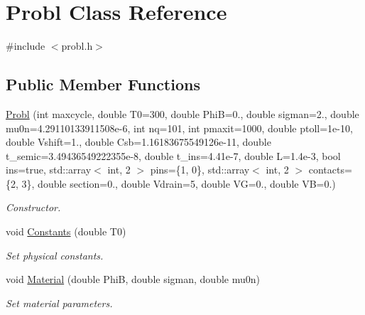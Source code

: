 \hypertarget{class_probl}{}\section{Probl Class Reference}
\label{class_probl}


{\ttfamily \#include $<$probl.\+h$>$}

\subsection*{Public Member Functions}
\begin{DoxyCompactItemize}
\item 
\mbox{\label{class_probl_a692b15a88516cb52437bd60f33a8edf0}} 
\mbox{\hyperlink{class_probl_a692b15a88516cb52437bd60f33a8edf0}{Probl}} (int maxcycle, double T0=300, double PhiB=0., double sigman=2., double mu0n=4.\+29110133911508e-\/6, int nq=101, int pmaxit=1000, double ptoll=1e-\/10, double Vshift=1., double Csb=1.\+16183675549126e-\/11, double t\+\_\+semic=3.\+49436549222355e-\/8, double t\+\_\+ins=4.\+41e-\/7, double L=1.\+4e-\/3, bool ins=true, std\+::array$<$ int, 2 $>$ pins=\{1, 0\}, std\+::array$<$ int, 2 $>$ contacts=\{2, 3\}, double section=0., double Vdrain=5, double V\+G=0., double V\+B=0.)
\begin{DoxyCompactList}\small\item\em Constructor. \end{DoxyCompactList}\item 
\mbox{\label{class_probl_ab73c319317dcb9cce6b491b0d13ed882}} 
void \mbox{\hyperlink{class_probl_ab73c319317dcb9cce6b491b0d13ed882}{Constants}} (double T0)
\begin{DoxyCompactList}\small\item\em Set physical constants. \end{DoxyCompactList}\item 
\mbox{\label{class_probl_af3f026d191bae1943873bd6cb150aedc}} 
void \mbox{\hyperlink{class_probl_af3f026d191bae1943873bd6cb150aedc}{Material}} (double PhiB, double sigman, double mu0n)
\begin{DoxyCompactList}\small\item\em Set material parameters. \end{DoxyCompactList}\item 
\mbox{\label{class_probl_a20e64318e853ac58c258c4c1d20a2315}} 

\end{DoxyCompactItemize}
